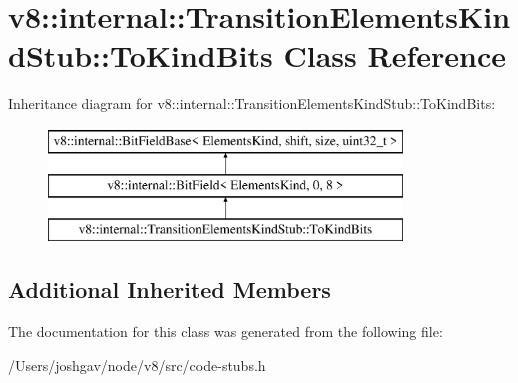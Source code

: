 \hypertarget{classv8_1_1internal_1_1_transition_elements_kind_stub_1_1_to_kind_bits}{}\section{v8\+:\+:internal\+:\+:Transition\+Elements\+Kind\+Stub\+:\+:To\+Kind\+Bits Class Reference}
\label{classv8_1_1internal_1_1_transition_elements_kind_stub_1_1_to_kind_bits}
Inheritance diagram for v8\+:\+:internal\+:\+:Transition\+Elements\+Kind\+Stub\+:\+:To\+Kind\+Bits\+:\begin{figure}[H]
\begin{center}
\leavevmode
\includegraphics[height=3.000000cm]{classv8_1_1internal_1_1_transition_elements_kind_stub_1_1_to_kind_bits}
\end{center}
\end{figure}
\subsection*{Additional Inherited Members}


The documentation for this class was generated from the following file\+:\begin{DoxyCompactItemize}
\item 
/\+Users/joshgav/node/v8/src/code-\/stubs.\+h\end{DoxyCompactItemize}
